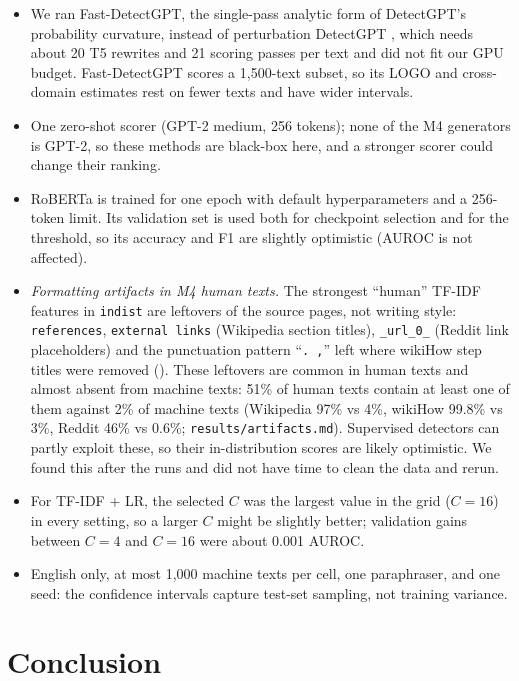 \documentclass{nle}
\begin{document}
\begin{itemize}
  \item We ran Fast-DetectGPT, the single-pass analytic form of DetectGPT's probability curvature, instead of
        perturbation DetectGPT \cite{mitchell23}, which needs about 20 T5 rewrites and 21 scoring passes per text and
        did not fit our GPU budget. Fast-DetectGPT scores a 1,500-text subset, so its LOGO and cross-domain
        estimates rest on fewer texts and have wider intervals.
  \item One zero-shot scorer (GPT-2 medium, 256 tokens); none of the M4 generators is GPT-2, so these methods are
        black-box here, and a stronger scorer could change their ranking.
  \item RoBERTa is trained for one epoch with default hyperparameters and a 256-token limit. Its validation set is
        used both for checkpoint selection and for the threshold, so its accuracy and F1 are slightly optimistic
        (AUROC is not affected).
  \item \emph{Formatting artifacts in M4 human texts.} The strongest ``human'' TF-IDF features in \texttt{indist}
        are leftovers of the source pages, not writing style: \texttt{references}, \texttt{external links}
        (Wikipedia section titles), \texttt{\_url\_0\_} (Reddit link placeholders) and the punctuation pattern
        ``\texttt{. ,}'' left where wikiHow step titles were removed ().
        These leftovers are common in human texts and almost absent from machine texts: 51\% of human texts contain
        at least one of them against 2\% of machine texts (Wikipedia 97\% vs 4\%, wikiHow 99.8\% vs 3\%, Reddit 46\%
        vs 0.6\%; \texttt{results/artifacts.md}).
        Supervised detectors can partly exploit these, so their in-distribution scores are likely optimistic. We
        found this after the runs and did not have time to clean the data and rerun.
  \item For TF-IDF + LR, the selected $C$ was the largest value in the grid ($C=16$) in every setting, so a larger
        $C$ might be slightly better; validation gains between $C=4$ and $C=16$ were about 0.001 AUROC.
  \item English only, at most 1,000 machine texts per cell, one paraphraser, and one seed: the confidence
        intervals capture test-set sampling, not training variance.
\end{itemize}

\section{Conclusion}
\end{document}
